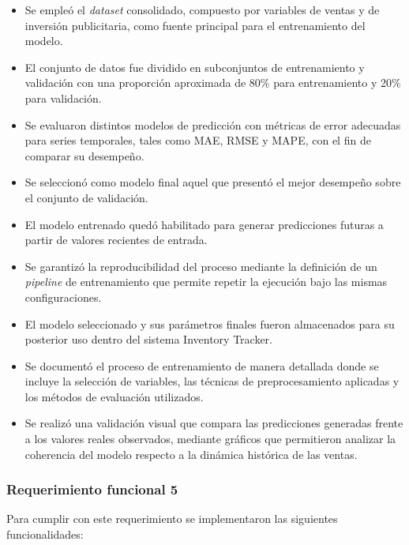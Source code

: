 \begin{itemize}
    \item Se empleó el \textit{dataset} consolidado, compuesto por variables de ventas y de inversión publicitaria, como fuente principal para el entrenamiento del modelo.
    \item El conjunto de datos fue dividido en subconjuntos de entrenamiento y validación con una proporción aproximada de 80\% para entrenamiento y 20\% para validación.
    \item Se evaluaron distintos modelos de predicción con métricas de error adecuadas para series temporales, tales como MAE, RMSE y MAPE, con el fin de comparar su desempeño.
    \item Se seleccionó como modelo final aquel que presentó el mejor desempeño sobre el conjunto de validación.
    \item El modelo entrenado quedó habilitado para generar predicciones futuras a partir de valores recientes de entrada.
    \item Se garantizó la reproducibilidad del proceso mediante la definición de un \textit{pipeline} de entrenamiento que permite repetir la ejecución bajo las mismas configuraciones.
    \item El modelo seleccionado y sus parámetros finales fueron almacenados para su posterior uso dentro del sistema Inventory Tracker.
    \item Se documentó el proceso de entrenamiento de manera detallada donde se incluye la selección de variables, las técnicas de preprocesamiento aplicadas y los métodos de evaluación utilizados.
    \item Se realizó una validación visual que compara las predicciones generadas frente a los valores reales observados, mediante gráficos que permitieron analizar la coherencia del modelo respecto a la dinámica histórica de las ventas.
\end{itemize}


\subsubsection{Requerimiento funcional 5}

Para cumplir con este requerimiento se implementaron las siguientes funcionalidades:

